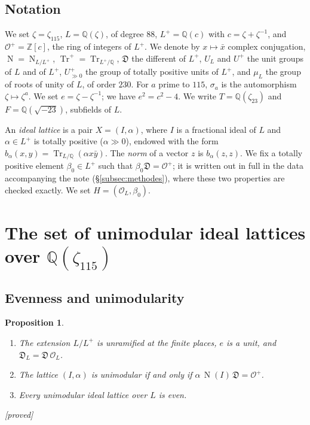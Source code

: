 \documentclass[11pt,a4paper]{amsart}
\theoremstyle{plain}
\newtheorem{proposition}[theorem]{Proposition}
\theoremstyle{definition}
\numberwithin{equation}{section}
\newcommand{\Q}{\mathbb{Q}}
\newcommand{\Z}{\mathbb{Z}}
\newcommand{\OO}{\mathcal{O}}
\newcommand{\Op}{\mathcal{O}^{+}}
\newcommand{\Dif}{\mathfrak{D}}
\DeclareMathOperator{\Tr}{Tr}
\DeclareMathOperator{\Nm}{N}
\newcommand{\Up}{U^{+}}
\newcommand{\Upp}{U^{+}_{\gg0}}
\newcommand{\Trp}{\Tr^{+}}
\newcommand{\st}[1]{\textup{\textsf{\small[#1]}}}
\newcommand{\DEM}{\st{proved}}
\begin{document}
\subsection*{Notation}
We set $\zeta=\zeta_{115}$, $L=\Q(\zeta)$, of degree $88$, $L^+=\Q(c)$ with $c=\zeta+\zeta^{-1}$, and $\Op=\Z[c]$, the ring of integers of $L^+$. We denote by $x\mapsto\bar x$ complex conjugation, $\Nm=\Nm_{L/L^+}$, $\Trp=\Tr_{L^+/\Q}$, $\Dif$ the different of $L^+$, $U_L$ and $\Up$ the unit groups of $L$ and of $L^+$, $\Upp$ the group of totally positive units of $L^+$, and $\mu_L$ the group of roots of unity of $L$, of order $230$. For $a$ prime to $115$, $\sigma_a$ is the automorphism $\zeta\mapsto\zeta^a$. We set $e=\zeta-\zeta^{-1}$; we have $e^2=c^2-4$. We write $T=\Q(\zeta_{23})$ and $F=\Q(\sqrt{-23})$, subfields of $L$.

An \emph{ideal lattice} is a pair $X=(I,\alpha)$, where $I$ is a fractional ideal of $L$ and $\alpha\in L^+$ is totally positive ($\alpha\gg0$), endowed with the form $b_\alpha(x,y)=\Tr_{L/\Q}(\alpha x\bar y)$. The \emph{norm} of a vector $z$ is $b_\alpha(z,z)$. We fix a totally positive element $\beta_0\in L^+$ such that $\beta_0\Dif=\Op$; it is written out in full in the data accompanying the note (\S\ref{subsec:methodes}), where these two properties are checked exactly. We set $H=(\OO_L,\beta_0)$.

\section{The set of unimodular ideal lattices over \texorpdfstring{$\Q(\zeta_{115})$}{Q(zeta115)}}\label{sec:S}

\subsection{Evenness and unimodularity}

\begin{proposition}\label{prop:pair}
\begin{enumerate}[label=\textup{(\alph*)}]
\item The extension $L/L^+$ is unramified at the finite places, $e$ is a unit, and $\Dif_L=\Dif\,\OO_L$.
\item The lattice $(I,\alpha)$ is unimodular if and only if $\alpha\,\Nm(I)\,\Dif=\Op$.
\item Every unimodular ideal lattice over $L$ is even.
\end{enumerate}
\DEM
\end{proposition}
\end{document}
